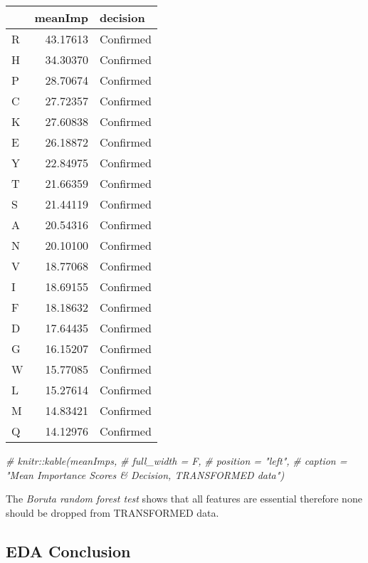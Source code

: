 \documentclass[]{article}
\newenvironment{Shaded}{\begin{snugshade}}{\end{snugshade}}
\newcommand{\CommentTok}[1]{\textcolor[rgb]{0.56,0.35,0.01}{\textit{#1}}}
\begin{document}
\begin{table}[H]
\centering
\begin{tabular}{l|r|l}
\hline
  & meanImp & decision\\
\hline
R & 43.17613 & Confirmed\\
\hline
H & 34.30370 & Confirmed\\
\hline
P & 28.70674 & Confirmed\\
\hline
C & 27.72357 & Confirmed\\
\hline
K & 27.60838 & Confirmed\\
\hline
E & 26.18872 & Confirmed\\
\hline
Y & 22.84975 & Confirmed\\
\hline
T & 21.66359 & Confirmed\\
\hline
S & 21.44119 & Confirmed\\
\hline
A & 20.54316 & Confirmed\\
\hline
N & 20.10100 & Confirmed\\
\hline
V & 18.77068 & Confirmed\\
\hline
I & 18.69155 & Confirmed\\
\hline
F & 18.18632 & Confirmed\\
\hline
D & 17.64435 & Confirmed\\
\hline
G & 16.15207 & Confirmed\\
\hline
W & 15.77085 & Confirmed\\
\hline
L & 15.27614 & Confirmed\\
\hline
M & 14.83421 & Confirmed\\
\hline
Q & 14.12976 & Confirmed\\
\hline
\end{tabular}
\end{table}

\begin{Shaded}
\begin{Highlighting}[]
\CommentTok{# knitr::kable(meanImps,}
\CommentTok{# full_width = F,}
\CommentTok{# position = "left",}
\CommentTok{# caption = "Mean Importance Scores & Decision, TRANSFORMED data")}
\end{Highlighting}
\end{Shaded}

The \emph{Boruta random forest test} shows that all features are
essential therefore none should be dropped from TRANSFORMED data.

\hypertarget{eda-conclusion}{%
\subsection{EDA Conclusion}\label{eda-conclusion}}
\end{document}
